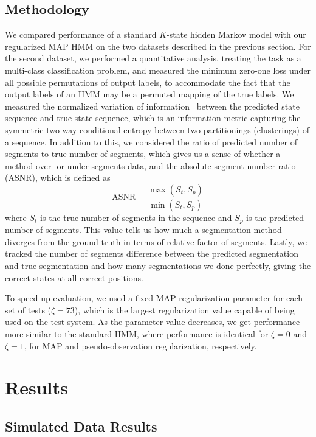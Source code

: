 \documentclass[12pt]{article}
\begin{document}
\subsection{Methodology}

We compared performance of a standard $K$-state hidden Markov model with our regularized MAP HMM on the two datasets described in the previous section. For the second dataset, we performed a quantitative analysis, treating the task as a multi-class classification problem, and measured the minimum zero-one loss under all possible permutations of output labels, to accommodate the fact that the output labels of an HMM may be a permuted mapping of the true labels. We measured the normalized variation of information~\cite{meila} between the predicted state sequence and true state sequence, which is an information metric capturing the symmetric two-way conditional entropy between two partitionings (clusterings) of a sequence.  In addition to this, we considered the ratio of predicted number of segments to true number of segments, which gives us a sense of whether a method over- or under-segments data, and the absolute segment number ratio (ASNR), which is defined as
\[
    \text{ASNR} = \frac{\max(S_t, S_p)}{\min(S_t, S_p)}
\]
where $S_t$ is the true number of segments in the sequence and $S_p$ is the predicted number of segments. This value tells us how much a segmentation method diverges from the ground truth in terms of relative factor of segments. Lastly, we tracked the number of segments difference between the predicted segmentation and true segmentation and how many segmentations we done perfectly, giving the correct states at all correct positions.

To speed up evaluation, we used a fixed MAP regularization parameter for each set of tests ($\zeta = 73$), which is the largest regularization value capable of being used on the test system. As the parameter value decreases, we get performance more similar to the standard HMM, where performance is identical for $\zeta = 0$ and $\zeta = 1$, for MAP and pseudo-observation regularization, respectively.

\section{Results}

\subsection{Simulated Data Results}
\end{document}
